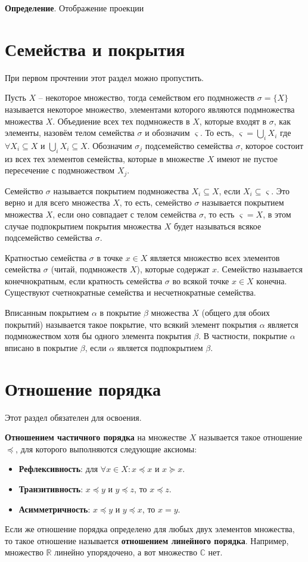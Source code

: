 \documentclass[a4paper]{book}
\begin{document}
\textbf{Определение}. Отображение проекции 

\section{Семейства и покрытия}
При первом прочтении этот раздел можно пропустить. 

Пусть $X$ -- некоторое множество, тогда семейством его подмножеств $\sigma = \{X\}$ называется некоторое множество, элементами которого являются подмножества множества $X$. Объедиение всех тех подмножеств в $X$, которые входят в $\sigma$, как элементы, назовём телом семейства $\sigma$ и обозначим $\varsigma$. То есть, $\varsigma = \bigcup_i X_i$ где $\forall X_i \subseteq X$ и $\bigcup_i X_i\subseteq X$. Обозначим $\sigma_j$ подсемейство семейства $\sigma$, которое состоит из всех тех элементов семейства, которые в множестве $X$ имеют не пустое пересечение с подмножеством $X_j$. 

Семейство $\sigma$ называется покрытием подмножества $X_i \subseteq X$, если $X_i \subseteq\varsigma$. Это верно и для всего множества $X$, то есть, семейство $\sigma$ называется покрытием множества $X$, если оно совпадает с телом семейства $\sigma$, то есть $\varsigma = X$, в этом случае подпокрытием покрытия множества $X$ будет называться всякое подсемейство семейства $\sigma$. 

Кратностью семейства $\sigma$ в точке $x\in X$ является множество всех элементов семейства $\sigma$ (читай, подмножеств $X$), которые содержат $x$. Семейство называется конечнократным, если кратность семейства $\sigma$ во всякой точке $x\in X$ конечна. Существуют счетнократные семейства и несчетнократные семейства. 

Вписанным покрытием $\alpha$ в покрытие $\beta$ множества $X$ (общего для обоих покрытий) называется такое покрытие, что всякий элемент покрытия $\alpha$ является подмножеством хотя бы одного элемента покрытия $\beta$. В частности, покрытие $\alpha$ вписано в покрытие $\beta$, если $\alpha$ является подпокрытием $\beta$. 

\section{Отношение порядка}
Этот раздел обязателен для освоения. 

\textbf{Отношением частичного порядка} на множестве $X$ называется такое отношение $\preceq$, для которого выполняются следующие аксиомы: 
\begin{itemize}
	\item \textbf{Рефлексивность}: для $\forall x\in X: x\preceq x$ и $x\succeq x$.
	\item \textbf{Транзитивность}: $x\preceq y$ и $y\preceq z$, то $x\preceq z$.
	\item \textbf{Асимметричность}: $x\preceq y$ и $y\preceq x$, то $x=y$.
\end{itemize}
Если же отношение порядка определено для любых двух элементов множества, то такое отношение называется \textbf{отношением линейного порядка}. Например, множество $\mathbb R$ линейно упорядочено, а вот множество $\mathbb C$ нет. 
\end{document}
